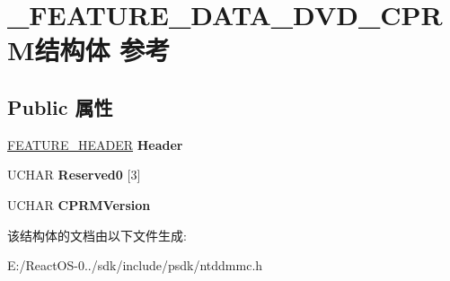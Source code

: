 \hypertarget{struct___f_e_a_t_u_r_e___d_a_t_a___d_v_d___c_p_r_m}{}\section{\+\_\+\+F\+E\+A\+T\+U\+R\+E\+\_\+\+D\+A\+T\+A\+\_\+\+D\+V\+D\+\_\+\+C\+P\+R\+M结构体 参考}
\label{struct___f_e_a_t_u_r_e___d_a_t_a___d_v_d___c_p_r_m}
\subsection*{Public 属性}
\begin{DoxyCompactItemize}
\item 
\mbox{\label{struct___f_e_a_t_u_r_e___d_a_t_a___d_v_d___c_p_r_m_a51b86b28637ff946bd90bccc37273cb3}} 
\hyperlink{struct___f_e_a_t_u_r_e___h_e_a_d_e_r}{F\+E\+A\+T\+U\+R\+E\+\_\+\+H\+E\+A\+D\+ER} {\bfseries Header}
\item 
\mbox{\label{struct___f_e_a_t_u_r_e___d_a_t_a___d_v_d___c_p_r_m_a79c95272ecf5e3d51254df03bddfa9d8}} 
U\+C\+H\+AR {\bfseries Reserved0} \mbox{[}3\mbox{]}
\item 
\mbox{\label{struct___f_e_a_t_u_r_e___d_a_t_a___d_v_d___c_p_r_m_af6c8b78ae6f1203c23b22e74e1193cc7}} 
U\+C\+H\+AR {\bfseries C\+P\+R\+M\+Version}
\end{DoxyCompactItemize}


该结构体的文档由以下文件生成\+:\begin{DoxyCompactItemize}
\item 
E\+:/\+React\+O\+S-\/0../sdk/include/psdk/ntddmmc.\+h\end{DoxyCompactItemize}
